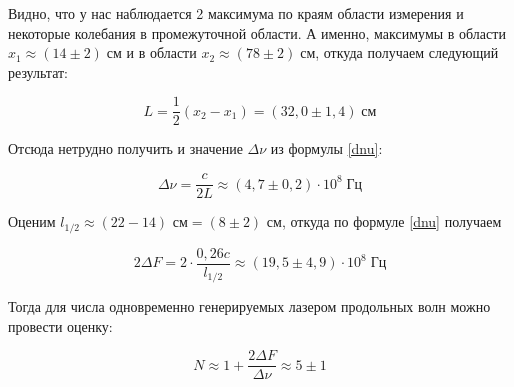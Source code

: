 \documentclass[a4paper,12pt]{article} %
\begin{document}
Видно, что у нас наблюдается 2 максимума по краям области измерения и некоторые колебания в промежуточной области. А именно, максимумы в области $ x_1 \approx (14 \pm 2) \; \text{см} $ и в области $ x_2 \approx (78 \pm 2) \; \text{см} $, откуда получаем следующий результат:

\begin{equation}\label{}
L = \dfrac{1}{2} (x_2 - x_1) = (32,0 \pm 1,4) \; \text{см}
\end{equation}

Отсюда нетрудно получить и значение $ \Delta \nu $ из формулы \eqref{dnu}:

\begin{equation}\label{}
\Delta \nu = \dfrac{c}{2L} \approx (4,7 \pm 0,2) \cdot 10^8 \; \text{Гц}
\end{equation}

Оценим $ l_{1/2} \approx (22 - 14) \text{ см} = (8 \pm 2) \text{ см} $, откуда по формуле \eqref{dnu} получаем

\begin{equation}\label{}
2\Delta F = 2\cdot \dfrac{0,26 c}{l_{1/2}} \approx (19,5 \pm 4,9) \cdot 10^8 \; \text{Гц}
\end{equation}

Тогда для числа одновременно генерируемых лазером продольных волн можно провести оценку:

\begin{equation}\label{}
N \approx 1 + \dfrac{ 2\Delta F}{\Delta \nu} \approx 5 \pm 1
\end{equation}
\end{document}
